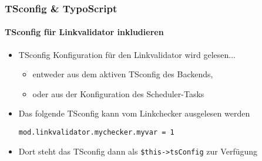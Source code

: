 %

\begin{frame}[fragile]
	\frametitle{TSconfig \& TypoScript}
	\framesubtitle{TSconfig für Linkvalidator inkludieren}

	\begin{itemize}
		\item TSconfig Konfiguration für den Linkvalidator wird gelesen...

			\begin{itemize}
				\item entweder aus dem aktiven TSconfig des Backends,
				\item oder aus der Konfiguration des Scheduler-Tasks
			\end{itemize}

		\item Das folgende TSconfig kann vom Linkchecker ausgelesen werden

			\lstinline!mod.linkvalidator.mychecker.myvar = 1!

		\item Dort steht das TSconfig dann als \texttt{\$this->tsConfig} zur Verfügung
	\end{itemize}

\end{frame}


